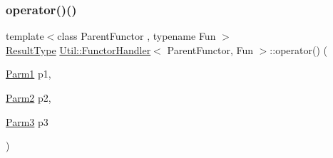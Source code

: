 \mbox{\label{classUtil_1_1FunctorHandler_a7f8257ee5864ceec038116184231eb63}} 
\subsubsection{\texorpdfstring{operator()()}{operator()()}\hspace{0.1cm}{\footnotesize\ttfamily [8/12]}}
{\footnotesize\ttfamily template$<$class Parent\+Functor , typename Fun $>$ \\
\mbox{\hyperlink{classUtil_1_1FunctorHandler_a036da44b8cc2567704cebd2a20d16c80}{Result\+Type}} \mbox{\hyperlink{classUtil_1_1FunctorHandler}{Util\+::\+Functor\+Handler}}$<$ Parent\+Functor, Fun $>$\+::operator() (\begin{DoxyParamCaption}\item[{\mbox{\hyperlink{classUtil_1_1FunctorHandler_a0a902ba40a0ab746f1c29a81d68ae0db}{Parm1}}}]{p1,  }\item[{\mbox{\hyperlink{classUtil_1_1FunctorHandler_a5fb5374c316f8ac252aa22fcdf7d21a7}{Parm2}}}]{p2,  }\item[{\mbox{\hyperlink{classUtil_1_1FunctorHandler_a25f1b9dd7890c1dbc68abc686f30bec8}{Parm3}}}]{p3 }\end{DoxyParamCaption})\hspace{0.3cm}{\ttfamily [inline]}}

\mbox{\label{classUtil_1_1FunctorHandler_a2d310b7fe0c60af9889d0ac218406cd9}} 
